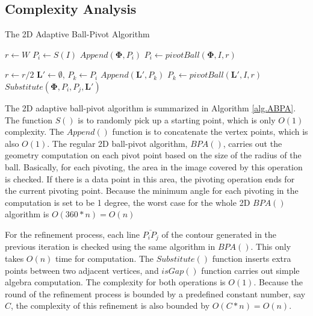 \documentclass{article}
\begin{document}
\subsection{Complexity Analysis}
\label{sec:CA}

\begin{algorithm}
\caption{The 2D Adaptive Ball-Pivot Algorithm}
\label{alg.ABPA}
\begin{algorithmic}[1]
\State $r \leftarrow W$
\State $P_i \leftarrow S(I) $ 
   \State $Append(\boldsymbol{\Phi}, P_i)$
   \State $P_i \leftarrow pivotBall(\boldsymbol{\Phi}, I, r)$ 
\EndWhile

 
   \State $r \leftarrow r/2$
      \State $\boldsymbol{L'} \leftarrow \emptyset$, $P_k \leftarrow P_i$
         \State $Append(\boldsymbol{L'}, P_k)$
         \State $P_k \leftarrow pivotBall(\boldsymbol{L'}, I, r)$
      \EndWhile
         \State $Substitute(\boldsymbol{\Phi}, P_i, P_j, \boldsymbol{L'})$
      \EndIf
   \EndFor
\EndWhile
\EndProcedure
\end{algorithmic}
\end{algorithm}

The 2D adaptive ball-pivot algorithm is summarized in Algorithm \ref{alg.ABPA}.
The function $S()$ is to randomly pick up a starting point, which
is only $O(1)$ complexity. The $Append()$ function is to concatenate the vertex
points, which is also $O(1)$. The regular 2D ball-pivot algorithm, $BPA()$,
carries out the geometry computation on each pivot point based on the size of the
radius of the ball. Basically, for each pivoting, the area
in the image covered by this operation is checked. If there is a data point in
this area, the pivoting operation ends for the current pivoting point.
Because the minimum angle for each pivoting in the computation is set to be 1 degree,
the worst case for the whole 2D $BPA()$ algorithm is $O(360*n) = O(n)$

For the refinement process, each line $\overline{P_iP_j}$ of the contour generated
in the previous iteration is checked using the same algorithm in $BPA()$. This only
takes $O(n)$ time for computation. The $Substitute()$ function inserts extra
points between two adjacent vertices, and $isGap()$ function carries out simple algebra computation.
The complexity for both operations is $O(1)$.
Because the round of the refinement process is bounded by a predefined constant
number, say $C$, the complexity of this refinement is also bounded by $O(C*n) = O(n)$.
\end{document}
